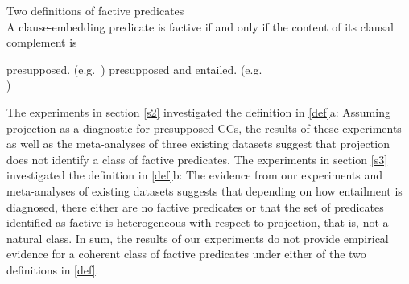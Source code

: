 \documentclass{language}
\newcommand{\6}{\mbox{$[\hspace*{-.6mm}[$}}
\newcommand{\9}{\mbox{$]\hspace*{-.6mm}]$}}
\begin{document}
\begin{exe}
\exi{(\ref{def})} Two definitions of factive predicates \\ A clause-embedding predicate is factive if and only if the content of its clausal complement is 
\begin{xlist}
\ex presupposed. \hfill (e.g.\ \citealt{kiparsky-kiparsky70,karttunen71-implicative,karttunen71b})
\ex presupposed and entailed.  \hfill (e.g.\ \citealt{gazdar79a,schlenker10,abrusan2011}\\\hspace*{.2cm}\hfill \citealt{anand-hacquard2014,spector-egre2015})
\end{xlist}
\end{exe}
The experiments in section \ref{s2} investigated the definition in \ref{def}a: Assuming projection as a diagnostic for presupposed CCs, the results of these experiments as well as the meta-analyses of three existing datasets suggest that projection does not identify a class of factive predicates. The experiments in section \ref{s3} investigated the definition in \ref{def}b: The evidence from our experiments and meta-analyses of existing datasets suggests that depending on how entailment is diagnosed, there either are no factive predicates or that the set of predicates identified as factive is heterogeneous with respect to projection, that is, not a natural class. In sum, the results of our experiments do not provide empirical evidence for a coherent class of factive predicates under either of the two definitions in \ref{def}.
\end{document}
